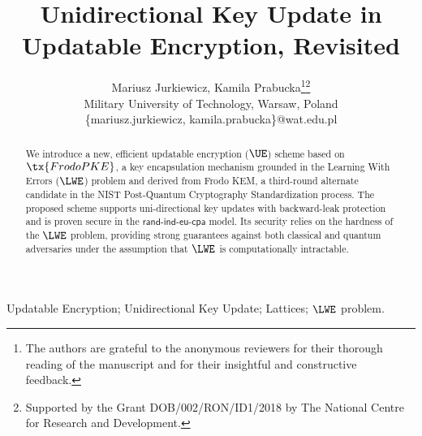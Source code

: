 \documentclass{fundam}
\begin{document}
\title{Unidirectional Key Update in Updatable Encryption, Revisited}

\address{Military University of Technology, Kaliskiego 2 00-908 Warsaw}

\author{Mariusz Jurkiewicz, Kamila Prabucka\thanks{The authors are grateful to the anonymous reviewers for their thorough reading of the manuscript and for their insightful and constructive feedback.}\thanks{Supported by the Grant DOB/002/RON/ID1/2018 by The National Centre for Research and Development.}\\
	Military University of Technology, Warsaw, Poland\\
	\{mariusz.jurkiewicz, kamila.prabucka\}@wat.edu.pl}

\maketitle


\begin{abstract}
	We introduce a new, efficient updatable encryption ($\UE$) scheme based on $\tx{FrodoPKE}$, a key encapsulation mechanism grounded in the Learning With Errors ($\LWE$) problem and derived from Frodo KEM, a third-round alternate candidate in the NIST Post-Quantum Cryptography Standardization process. %
The proposed scheme supports uni-directional key updates with backward-leak protection and is proven secure in the $\mathsf{rand}$-$\mathsf{ind}$-$\mathsf{eu}$-$\mathsf{cpa}$ model. Its security relies on the hardness of the $\LWE$ problem, providing strong guarantees against both classical and quantum adversaries under the assumption that $\LWE$ is computationally intractable.
\end{abstract}


\begin{keywords}
	Updatable Encryption; Unidirectional Key Update;  Lattices; $\LWE$ problem.
\end{keywords}
\end{document}
